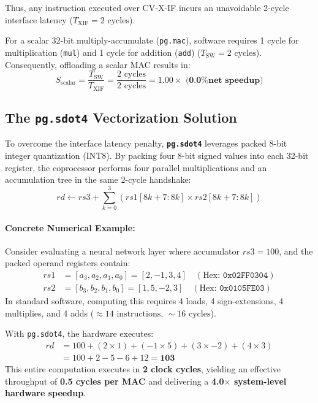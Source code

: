 \documentclass[11pt,a4paper]{article}
\begin{document}
Thus, any instruction executed over CV-X-IF incurs an unavoidable 2-cycle interface latency ($T_{\text{XIF}} = 2\text{ cycles}$).

For a scalar 32-bit multiply-accumulate (\texttt{pg.mac}), software requires 1 cycle for multiplication (\texttt{mul}) and 1 cycle for addition (\texttt{add}) ($T_{\text{SW}} = 2\text{ cycles}$). Consequently, offloading a scalar MAC results in:
\begin{equation}
    S_{\text{scalar}} = \frac{T_{\text{SW}}}{T_{\text{XIF}}} = \frac{2\text{ cycles}}{2\text{ cycles}} = \mathbf{1.00\times \text{ (0.0\% net speedup)}}
\end{equation}

\subsection{The \texttt{pg.sdot4} Vectorization Solution}
To overcome the interface latency penalty, \textbf{\texttt{pg.sdot4}} leverages packed 8-bit integer quantization (INT8). By packing four 8-bit signed values into each 32-bit register, the coprocessor performs four parallel multiplications and an accumulation tree in the same 2-cycle handshake:
\begin{equation}
    rd \leftarrow rs3 + \sum_{k=0}^3 \left( rs1[8k+7:8k] \times rs2[8k+7:8k] \right)
\end{equation}

\paragraph{Concrete Numerical Example:}
Consider evaluating a neural network layer where accumulator $rs3 = 100$, and the packed operand registers contain:
\begin{align*}
    rs1 &= [a_3, a_2, a_1, a_0] = [2, -1, 3, 4] \quad (\text{Hex: } \texttt{0x02FF0304}) \\
    rs2 &= [b_3, b_2, b_1, b_0] = [1, 5, -2, 3] \quad (\text{Hex: } \texttt{0x0105FE03})
\end{align*}
In standard software, computing this requires 4 loads, 4 sign-extensions, 4 multiplies, and 4 adds ($\approx 14\text{ instructions, } \sim 16\text{ cycles}$). 

With \texttt{pg.sdot4}, the hardware executes:
\begin{align*}
    rd &= 100 + (2 \times 1) + (-1 \times 5) + (3 \times -2) + (4 \times 3) \\
       &= 100 + 2 - 5 - 6 + 12 = \mathbf{103}
\end{align*}
This entire computation executes in \textbf{2 clock cycles}, yielding an effective throughput of \textbf{0.5 cycles per MAC} and delivering a \textbf{4.0$\times$ system-level hardware speedup}.
\end{document}
